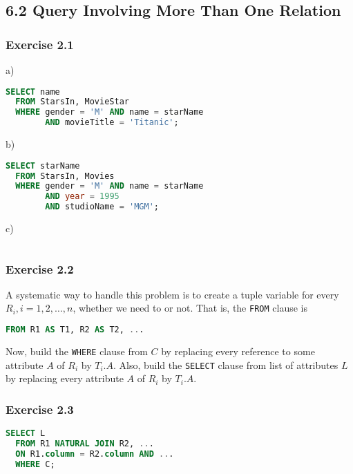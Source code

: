 \documentclass[../../main.tex]{subfiles}
\begin{document}
\subsection*{6.2 Query Involving More Than One Relation}

\subsubsection*{Exercise 2.1}

a)

\begin{lstlisting}[language=sql]
  SELECT name
  FROM StarsIn, MovieStar
  WHERE gender = 'M' AND name = starName
        AND movieTitle = 'Titanic';
\end{lstlisting}

b)

\begin{lstlisting}[language=sql]
  SELECT starName
  FROM StarsIn, Movies
  WHERE gender = 'M' AND name = starName
        AND year = 1995
        AND studioName = 'MGM';
\end{lstlisting}

c)

\begin{lstlisting}[language=sql]

\end{lstlisting}

\subsubsection*{Exercise 2.2}

A systematic way to handle this problem is to create
a tuple variable for every $R_{i}, i = 1,2,\dots,n$,
whether we need to or not. That is, the \verb|FROM|
clause is

\begin{lstlisting}[language=sql]
  FROM R1 AS T1, R2 AS T2, ...
\end{lstlisting}

Now, build the \verb|WHERE| clause from $C$ by
replacing every reference to some attribute $A$
of $R_{i}$ by $T_{i}.A$. Also, build the
\verb|SELECT| clause from list of attributes $L$
by replacing every attribute $A$ of $R_{i}$ by
$T_{i}.A$.

\subsubsection*{Exercise 2.3}

\begin{lstlisting}[language=sql]
  SELECT L
  FROM R1 NATURAL JOIN R2, ...
  ON R1.column = R2.column AND ...
  WHERE C;
\end{lstlisting}
\end{document}
